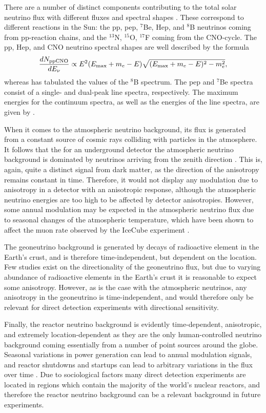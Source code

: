 There are a number of distinct components contributing to the total solar neutrino flux with different fluxes and spectral shapes \parencite{VitaglianoTamborraRaffelt2020}. These correspond to different reactions in the Sun: the pp, pep, $^7$Be, Hep, and $^8$B neutrinos coming from pp-reaction chains, and the $^{13}$N, $^{15}$O, $^{17}$F coming from the CNO-cycle. The pp, Hep, and CNO neutrino spectral shapes are well described by the formula
\begin{equation}
    \frac{dN_\text{ppCNO}}{dE_\nu}\propto E^2(E_\text{max}+m_e-E)\sqrt{(E_\text{max}+m_e-E)^2-m_e^2},
\end{equation}
whereas \textcite{BahcallEtAl1996} has tabulated the values of the $^8$B spectrum. The pep and $^7$Be spectra consist of a single- and dual-peak line spectra, respectively. The maximum energies for the continuum spectra, as well as the energies of the line spectra, are given by \textcite{Bahcall1997}.

When it comes to the atmospheric neutrino background, its flux is generated from a constant source of cosmic rays colliding with particles in the atmosphere. It follows that the for an underground detector the atmospheric neutrino background is dominated by neutrinos arriving from the zenith direction \parencite{GaisserHonda2002}. This is, again, quite a distinct signal from dark matter, as the direction of the anisotropy remains constant in time. Therefore, it would not display any modulation due to anisotropy in a detector with an anisotropic response, although the atmospheric neutrino energies are too high to be affected by detector anisotropies. However, some annual modulation may be expected in the atmospheric neutrino flux due to seasonal changes of the atmospheric temperature, which have been shown to affect the muon rate observed by the IceCube experiment \parencite{SerapEtAl2010}.

The geoneutrino background is generated by decays of radioactive element in the Earth's crust, and is therefore time-independent, but dependent on the location. Few studies exist on the directionality of the geoneutrino flux, but due to varying abundance of radioactive elements in the Earth's crust it is reasonable to expect some anisotropy. However, as is the case with the atmospheric neutrinos, any anisotropy in the geoneutrino is time-independent, and would therefore only be relevant for direct detection experiments with directional sensitivity.

Finally, the reactor neutrino background is evidently time-dependent, anisotropic, and extremely location-dependent as they are the only human-controlled neutrino background coming essentially from a number of point sources around the globe. Seasonal variations in power generation can lead to annual modulation signals, and reactor shutdowns and startups can lead to arbitrary variations in the flux over time \parencite{Baldoncini2015}. Due to sociological factors many direct detection experiments are located in regions which contain the majority of the world's nuclear reactors, and therefore the reactor neutrino background can be a relevant background in future experiments.

